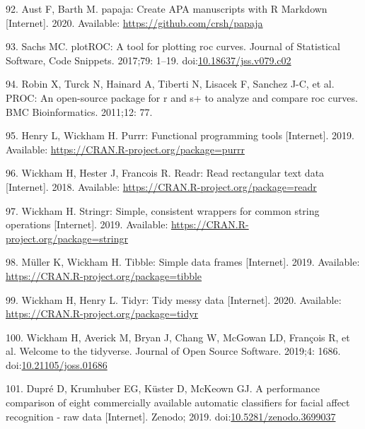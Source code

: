 \documentclass[10pt,letterpaper]{article}
\begin{document}
\leavevmode\hypertarget{ref-R-papaja}{}%
92. Aust F, Barth M. papaja: Create APA manuscripts with R Markdown {[}Internet{]}. 2020. Available: \url{https://github.com/crsh/papaja}

\leavevmode\hypertarget{ref-R-plotROC}{}%
93. Sachs MC. plotROC: A tool for plotting roc curves. Journal of Statistical Software, Code Snippets. 2017;79: 1--19. doi:\href{https://doi.org/10.18637/jss.v079.c02}{10.18637/jss.v079.c02}

\leavevmode\hypertarget{ref-R-pROC}{}%
94. Robin X, Turck N, Hainard A, Tiberti N, Lisacek F, Sanchez J-C, et al. PROC: An open-source package for r and s+ to analyze and compare roc curves. BMC Bioinformatics. 2011;12: 77.

\leavevmode\hypertarget{ref-R-purrr}{}%
95. Henry L, Wickham H. Purrr: Functional programming tools {[}Internet{]}. 2019. Available: \url{https://CRAN.R-project.org/package=purrr}

\leavevmode\hypertarget{ref-R-readr}{}%
96. Wickham H, Hester J, Francois R. Readr: Read rectangular text data {[}Internet{]}. 2018. Available: \url{https://CRAN.R-project.org/package=readr}

\leavevmode\hypertarget{ref-R-stringr}{}%
97. Wickham H. Stringr: Simple, consistent wrappers for common string operations {[}Internet{]}. 2019. Available: \url{https://CRAN.R-project.org/package=stringr}

\leavevmode\hypertarget{ref-R-tibble}{}%
98. Müller K, Wickham H. Tibble: Simple data frames {[}Internet{]}. 2019. Available: \url{https://CRAN.R-project.org/package=tibble}

\leavevmode\hypertarget{ref-R-tidyr}{}%
99. Wickham H, Henry L. Tidyr: Tidy messy data {[}Internet{]}. 2020. Available: \url{https://CRAN.R-project.org/package=tidyr}

\leavevmode\hypertarget{ref-R-tidyverse}{}%
100. Wickham H, Averick M, Bryan J, Chang W, McGowan LD, François R, et al. Welcome to the tidyverse. Journal of Open Source Software. 2019;4: 1686. doi:\href{https://doi.org/10.21105/joss.01686}{10.21105/joss.01686}

\leavevmode\hypertarget{ref-damien_dupre_2019_3699037}{}%
101. Dupré D, Krumhuber EG, Küster D, McKeown GJ. A performance comparison of eight commercially available automatic classifiers for facial affect recognition - raw data {[}Internet{]}. Zenodo; 2019. doi:\href{https://doi.org/10.5281/zenodo.3699037}{10.5281/zenodo.3699037}

\nolinenumbers
\end{document}
